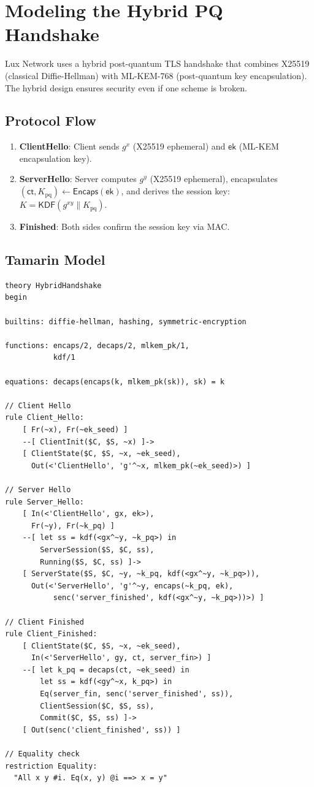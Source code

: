 \section{Modeling the Hybrid PQ Handshake}


Lux Network uses a hybrid post-quantum TLS handshake that combines X25519 (classical
Diffie-Hellman) with ML-KEM-768 (post-quantum key encapsulation). The hybrid design
ensures security even if one scheme is broken.

\subsection{Protocol Flow}

\begin{enumerate}
  \item \textbf{ClientHello}: Client sends $g^x$ (X25519 ephemeral) and $\mathsf{ek}$
    (ML-KEM encapsulation key).
  \item \textbf{ServerHello}: Server computes $g^y$ (X25519 ephemeral), encapsulates
    $(\mathsf{ct}, K_{\text{pq}}) \leftarrow \mathsf{Encaps}(\mathsf{ek})$, and derives
    the session key: $K = \mathsf{KDF}(g^{xy} \| K_{\text{pq}})$.
  \item \textbf{Finished}: Both sides confirm the session key via MAC.
\end{enumerate}

\subsection{Tamarin Model}

\begin{lstlisting}[language=Tamarin,caption={Hybrid handshake in Tamarin}]
theory HybridHandshake
begin

builtins: diffie-hellman, hashing, symmetric-encryption

functions: encaps/2, decaps/2, mlkem_pk/1,
           kdf/1

equations: decaps(encaps(k, mlkem_pk(sk)), sk) = k

// Client Hello
rule Client_Hello:
    [ Fr(~x), Fr(~ek_seed) ]
    --[ ClientInit($C, $S, ~x) ]->
    [ ClientState($C, $S, ~x, ~ek_seed),
      Out(<'ClientHello', 'g'^~x, mlkem_pk(~ek_seed)>) ]

// Server Hello
rule Server_Hello:
    [ In(<'ClientHello', gx, ek>),
      Fr(~y), Fr(~k_pq) ]
    --[ let ss = kdf(<gx^~y, ~k_pq>) in
        ServerSession($S, $C, ss),
        Running($S, $C, ss) ]->
    [ ServerState($S, $C, ~y, ~k_pq, kdf(<gx^~y, ~k_pq>)),
      Out(<'ServerHello', 'g'^~y, encaps(~k_pq, ek),
           senc('server_finished', kdf(<gx^~y, ~k_pq>))>) ]

// Client Finished
rule Client_Finished:
    [ ClientState($C, $S, ~x, ~ek_seed),
      In(<'ServerHello', gy, ct, server_fin>) ]
    --[ let k_pq = decaps(ct, ~ek_seed) in
        let ss = kdf(<gy^~x, k_pq>) in
        Eq(server_fin, senc('server_finished', ss)),
        ClientSession($C, $S, ss),
        Commit($C, $S, ss) ]->
    [ Out(senc('client_finished', ss)) ]

// Equality check
restriction Equality:
  "All x y #i. Eq(x, y) @i ==> x = y"
\end{lstlisting}

